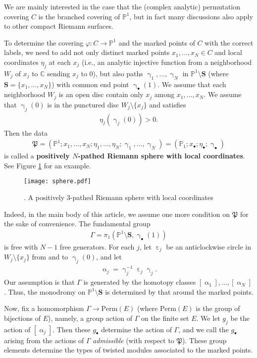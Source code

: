 \documentclass[11pt,b5paper,notitlepage]{article}
\theoremstyle{definition}
\theoremstyle{plain}
\newcommand{\fk}{\mathfrak}
\newcommand{\blt}{\bullet}
\newcommand{\Cbb}{\mathbb C}
\newcommand{\Pbb}{\mathbb P}
\newcommand{\Sbf}{\mathbf{S}}
\newcommand{\Perm}{\mathrm{Perm}}
\numberwithin{equation}{subsection}
\begin{document}
We are mainly interested in the case that the (complex analytic) permutation covering $C$ is the branched covering of $\Pbb^1$, but in fact many discussions also apply to other compact Riemann surfaces. 

To determine the covering $\varphi:C\rightarrow\Pbb^1$ and the marked points of $C$ with the correct labels, we need to add not only distinct marked points $x_1,\dots,x_N\in C$ and local coordinates $\eta_j$ at each $x_j$ (i.e., an analytic injective function from a neighborhood $W_j$ of $x_j$ to $\Cbb$ sending $x_j$ to $0$), but also paths $\upgamma_1,\dots,\upgamma_N$ in $\Pbb^1\setminus\Sbf$ (where $\Sbf=\{x_1,\dots,x_N\}$) with common end point $\upgamma_\blt(1)$. We assume that  each neighborhood $W_j$ is an open disc contain only $x_j$ among $x_1,\dots,x_N$. We assume that $\upgamma_j(0)$ is in the punctured disc $W_j\setminus\{x_j\}$ and satisfies
\begin{align}
\eta_j(\upgamma_j(0))>0.\label{eq101}	
\end{align}
Then the data
\begin{align}
\fk P=(\Pbb^1;x_1,\dots,x_N;\eta_1,\dots,\eta_N;\upgamma_1,\dots,\upgamma_N)=(\Pbb_1;x_\blt;\eta_\blt;\upgamma_\blt)\label{eq102}
\end{align}
is called a \textbf{positively $N$-pathed Riemann sphere with local coordinates}. See Figure \ref{fig1} for an example.
\begin{figure}[h]
	\centering
	\texttt{[image: sphere.pdf]}
	\caption{. A positively $3$-pathed Riemann sphere with local coordinates}
	\label{fig1}
\end{figure}

Indeed, in the main body of this article, we assume one more condition on  $\fk P$ for the sake of convenience. The fundamental group
\begin{align*}
\Gamma=\pi_1(\Pbb^1\setminus\Sbf,\upgamma_\blt(1))	
\end{align*}
is free with $N-1$ free generators. For each $j$, let $\upepsilon_j$ be an anticlockwise circle in $W_j\setminus\{x_j\}$ from and to $\upgamma_j(0)$, and let
\begin{align*}
\upalpha_j=\upgamma_j^{-1}\upepsilon_j\upgamma_j.	
\end{align*}
Our assumption is that $\Gamma$ is generated by the homotopy classes $[\upalpha_1],\dots,[\upalpha_N]$. Thus, the monodromy on $\Pbb^1\setminus\Sbf$ is determined by that around the marked points.


Now, fix a homomorphism $\Gamma\rightarrow\Perm(E)$ (where $\Perm(E)$ is the group of bijections of $E$), namely, a group action of $\Gamma$ on the finite set $E$. We let $g_j$ be the action of $[\upalpha_j]$. Then these $g_\blt$ determine the action of $\Gamma$, and we call the $g_\blt$ arising from the actions of $\Gamma$ \textit{admissible}  (with respect to $\fk P$). These group elements determine the types of twisted modules associated to the marked points.
\end{document}
